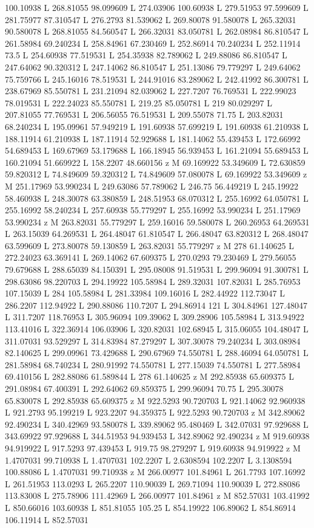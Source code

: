 {\begin{scope}[local bounding box=bb]
{100.10938 L 268.81055 98.099609 L 274.03906 100.60938 L 279.51953 97.599609 L 281.75977 87.310547 L 276.2793 81.539062 L 269.80078 91.580078 L 265.32031 90.580078 L 268.81055 84.560547 L 266.32031 83.050781 L 262.08984 86.810547 L 261.58984 69.240234 L 258.84961 67.230469 L 252.86914 70.240234 L 252.11914 73.5 L 254.60938 77.519531 L 254.35938 82.789062 L 249.88086 86.810547 L 247.64062 90.320312 L 247.14062 86.810547 L 251.13086 79.779297 L 249.64062 75.759766 L 245.16016 78.519531 L 244.91016 83.289062 L 242.41992 86.300781 L 238.67969 85.550781 L 231.21094 82.039062 L 227.7207 76.769531 L 222.99023 78.019531 L 222.24023 85.550781 L 219.25 85.050781 L 219 80.029297 L 207.81055 77.769531 L 206.56055 76.519531 L 209.55078 71.75 L 203.82031 68.240234 L 195.09961 57.949219 L 191.60938 57.699219 L 191.60938 61.210938 L 188.11914 61.210938 L 187.11914 52.929688 L 181.14062 55.439453 L 172.66992 54.689453 L 169.67969 53.179688 L 166.18945 56.939453 L 161.21094 55.689453 L 160.21094 51.669922 L 158.2207 48.660156 z M 69.169922 53.349609 L 72.630859 59.820312 L 74.849609 59.320312 L 74.849609 57.080078 L 69.169922 53.349609 z M 251.17969 53.990234 L 249.63086 57.789062 L 246.75 56.449219 L 245.19922 58.460938 L 248.30078 63.380859 L 248.51953 68.070312 L 255.16992 64.050781 L 255.16992 58.240234 L 257.60938 55.779297 L 255.16992 53.990234 L 251.17969 53.990234 z M 263.82031 55.779297 L 259.16016 59.580078 L 260.26953 64.269531 L 263.15039 64.269531 L 264.48047 61.810547 L 266.48047 63.820312 L 268.48047 63.599609 L 273.80078 59.130859 L 263.82031 55.779297 z M 278 61.140625 L 272.24023 63.369141 L 269.14062 67.609375 L 270.0293 79.230469 L 279.56055 79.679688 L 288.65039 84.150391 L 295.08008 91.519531 L 299.96094 91.300781 L 298.63086 98.220703 L 294.19922 105.58984 L 289.32031 107.82031 L 285.76953 107.15039 L 284 105.58984 L 281.33984 109.16016 L 282.44922 112.73047 L 286.2207 112.94922 L 290.88086 110.7207 L 294.86914 121 L 304.84961 127.48047 L 311.7207 118.76953 L 305.96094 109.39062 L 309.28906 105.58984 L 313.94922 113.41016 L 322.36914 106.03906 L 320.82031 102.68945 L 315.06055 104.48047 L 311.07031 93.529297 L 314.83984 87.279297 L 307.30078 79.240234 L 303.08984 82.140625 L 299.09961 73.429688 L 290.67969 74.550781 L 288.46094 64.050781 L 281.58984 68.740234 L 280.91992 74.550781 L 277.15039 74.550781 L 277.58984 69.410156 L 282.88086 61.589844 L 278 61.140625 z M 292.85938 65.609375 L 291.08984 67.400391 L 292.64062 69.859375 L 299.96094 70.75 L 295.30078 65.830078 L 292.85938 65.609375 z M 922.5293 90.720703 L 921.14062 92.960938 L 921.2793 95.199219 L 923.2207 94.359375 L 922.5293 90.720703 z M 342.89062 92.490234 L 340.42969 93.580078 L 339.89062 95.480469 L 342.07031 97.929688 L 343.69922 97.929688 L 344.51953 94.939453 L 342.89062 92.490234 z M 919.60938 94.919922 L 917.5293 97.439453 L 919.75 98.279297 L 919.60938 94.919922 z M 1.4707031 99.710938 L 1.4707031 102.2207 L 2.6308594 102.2207 L 3.1308594 100.88086 L 1.4707031 99.710938 z M 266.00977 101.84961 L 261.7793 107.16992 L 261.51953 113.0293 L 265.2207 110.90039 L 269.71094 110.90039 L 272.88086 113.83008 L 275.78906 111.42969 L 266.00977 101.84961 z M 852.57031 103.41992 L 850.66016 103.60938 L 851.81055 105.25 L 854.19922 106.89062 L 854.86914 106.11914 L 852.57031 }
\end{scope}}
